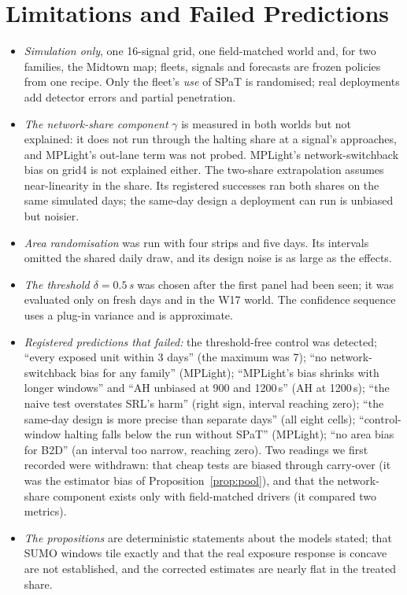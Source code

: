 \section{Limitations and Failed Predictions}\label{sec:limits}
\begin{itemize}\setlength\itemsep{1pt}
\item \emph{Simulation only}, one 16-signal grid, one field-matched world and, for two families, the Midtown map; fleets, signals and
forecasts are frozen policies from one recipe. Only the fleet's \emph{use} of SPaT is randomised; real deployments add detector errors
and partial penetration.
\item \emph{The network-share component} $\gamma$ is measured in both worlds but not explained: it does not run through the halting share
at a signal's approaches, and MPLight's out-lane term was not probed. MPLight's network-switchback bias on grid4 is not explained either.
The two-share extrapolation assumes near-linearity in the share. Its registered successes ran both shares on the same simulated days;
the same-day design a deployment can run is unbiased but noisier.
\item \emph{Area randomisation} was run with four strips and five days. Its intervals omitted the shared daily draw, and its design noise
is as large as the effects.
\item \emph{The threshold $\delta=0.5$\,s} was chosen after the first panel had been seen; it was evaluated only on fresh days and in the
W17 world. The confidence sequence uses a plug-in variance and is approximate.
\item \emph{Registered predictions that failed:} the threshold-free control was detected; ``every exposed unit within 3 days'' (the
maximum was 7); ``no network-switchback bias for any family'' (MPLight); ``MPLight's bias shrinks with longer windows'' and ``AH unbiased at 900 and 1200\,s'' (AH at 1200\,s); ``the naive test overstates SRL's harm'' (right sign, interval reaching zero); ``the same-day
design is more precise than separate days'' (all eight cells); ``control-window halting falls below the run without SPaT'' (MPLight);
``no area bias for B2D'' (an interval too narrow, reaching zero). Two readings we first recorded were withdrawn: that cheap tests are
biased through carry-over (it was the estimator bias of Proposition~\ref{prop:pool}), and that the network-share component exists only
with field-matched drivers (it compared two metrics).
\item \emph{The propositions} are deterministic statements about the models stated; that SUMO windows tile exactly and that the real
exposure response is concave are not established, and the corrected estimates are nearly flat in the treated share.
\end{itemize}

